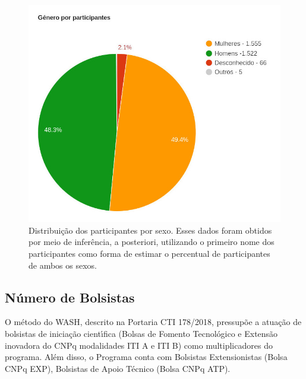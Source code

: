 \documentclass[
12pt,		%
openright,	%
twoside,  %
a4paper,			%
chapter=TITLE,		%
english,			%
french,				%
spanish,			%
brazil				%
]{USPSC-classe/USPSC}
\begin{document}
\captionsetup{format=plain}
\begin{figure}[max size={\textwidth}{\textheight}]

\centering


\begin{minipage}[b]{0.4\linewidth}
        \centering
                \includegraphics[width=1.0\linewidth]{../../imagens/genero-todos-crop.jpeg}
                \caption{Distribui\c{c}\~ao dos participantes por sexo. Esses dados foram obtidos por meio de infer\^encia, a posteriori, utilizando o primeiro nome dos participantes como forma de estimar o percentual de participantes de ambos os sexos.}
                \label{ef11d820efb73d78fb64eb6bdd03853471a8e89f}
\end{minipage}%
\hspace{0.5cm}
\end{figure}



\subsection[N\'umero de Bolsistas]{N\'umero de Bolsistas}\label{N\'umero de Bolsistas}
O m\'etodo do WASH, descrito na Portaria CTI 178/2018, pressup\~oe a atua\c{c}\~ao de bolsistas de inicia\c{c}\~ao cient\'{\i}fica (Bolsas de Fomento Tecnol\'ogico e Extens\~ao inovadora  do CNPq modalidades ITI A e ITI B) como multiplicadores do programa. Al\'em disso, o Programa conta com Bolsistas Extensionistas (Bolsa CNPq EXP), Bolsistas de Apoio T\'ecnico (Bolsa CNPq ATP).
\end{document}

